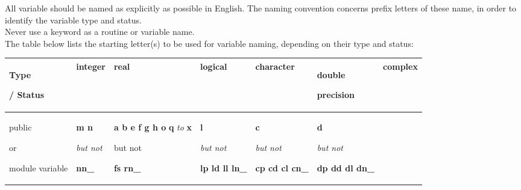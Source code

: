 All variable should be named as explicitly as possible in English.
The naming convention concerns prefix letters of these name, in order to identify the variable type and status. \\
Never use a \fortran keyword as a routine or variable name. \\
The table below lists the starting letter(s) to be used for variable naming, depending on their type and status:
\begin{table}[htbp]
  \begin{center}
    \begin{tabular}{|p{50pt}|p{50pt}|p{50pt}|p{50pt}|p{50pt}|p{50pt}|p{50pt}|}
      \hline
      Type \par / Status                                                                          &
      integer                                                                                     &
      real                                                                                        &
      logical                                                                                     &
      character                                                                                   &
      double \par precision                                                                       &
      complex                                                                                     \\
      \hline
      public \par or \par module variable                                                         &
      \textbf{m n} \par \textit{but not} \par \textbf{nn\_}                                       &
      \textbf{a b e f g h o} \textbf{q} \textit{to} \textbf{x} \par but not \par \textbf{fs rn\_} &
      \textbf{l} \par \textit{but not} \par \textbf{lp ld ll ln\_}                                &
      \textbf{c} \par \textit{but not} \par \textbf{cp cd cl cn\_}                                &
      \textbf{d} \par \textit{but not} \par \textbf{dp dd dl dn\_}                                &

\end{tabular}
\end{center}
\end{table}
